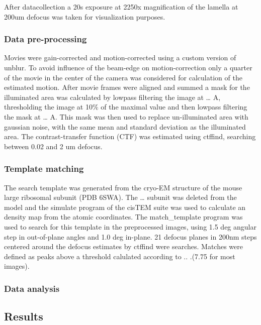\documentclass[
]{article}
\begin{document}
After datacollection a 20s exposure at 2250x magnification of the lamella at
200um defocus was taken for visualization purposes.

\hypertarget{data-pre-processing}{%
\subsubsection{Data pre-processing}\label{data-pre-processing}}

Movies were gain-corrected and motion-corrected using a custom version of
unblur. To avoid influence of the beam-edge on motion-correction only a quarter
of the movie in the center of the camera was considered for calculation of the
estimated motion. After movie frames were aligned and summed a mask for the
illuminated area was calculated by lowpass filtering the image at \ldots{} A,
thresholding the image at 10\% of the maximal value and then lowpass filtering
the mask at \ldots{} A. This mask was then used to replace un-illuminated area with
gaussian noise, with the same mean and standard deviation as the illuminated
area. The contrast-transfer function (CTF) was estimated using ctffind, searching
between 0.02 and 2 um defocus.

\hypertarget{template-matching}{%
\subsubsection{Template matching}\label{template-matching}}

The search template was generated from the cryo-EM structure of the mouse large
ribosomal subunit (PDB 6SWA). The \ldots{} subunit was deleted from the model and the
simulate program of the cisTEM suite was used to calculate an density map from
the atomic coordinates. The match\_template program was used to search for this
template in the preprocessed images, using 1.5 deg angular step in out-of-plane
angles and 1.0 deg in-plane. 21 defocus planes in 200nm steps centered around
the defocus estimates by ctffind were searches. Matches were defined as peaks
above a threshold calulated according to .. .(7.75 for most images).

\hypertarget{data-analysis}{%
\subsubsection{Data analysis}\label{data-analysis}}

\hypertarget{results}{%
\subsection{Results}\label{results}}
\end{document}
